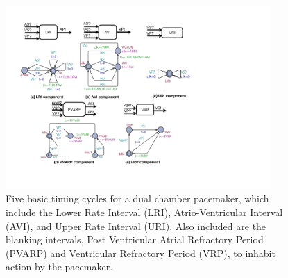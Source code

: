 \begin{figure}[!t]
\center
\includegraphics[width=0.9\textwidth]{figs/pacemaker.pdf}
\caption{Five basic timing cycles for a dual chamber pacemaker, which include the Lower Rate Interval (LRI), Atrio-Ventricular Interval (AVI), and Upper Rate Interval (URI). Also included are the blanking intervals, Post Ventricular Atrial Refractory Period (PVARP) and Ventricular Refractory Period (VRP), to inhabit action by the pacemaker.}
\label{fig:PMdesign}
\end{figure} 

